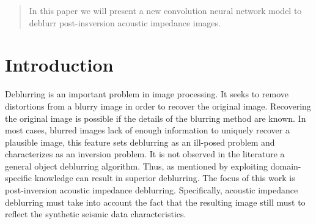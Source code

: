\documentclass[conference,compsoc]{IEEEtran}
\begin{document}




\maketitle

\begin{abstract}
In this paper we will present a new convolution neural network
model to deblurr post-insversion acoustic impedance images.

\end{abstract}





%
\IEEEpeerreviewmaketitle



\section{Introduction}
Deblurring is an important problem in image processing.
It seeks to remove distortions from a blurry image in order to
recover the original image. Recovering the original image
is possible if the details of the blurring method are known.
In most cases, blurred images lack of enough information
to uniquely recover a plausible image, this feature sets
deblurring as an ill-posed problem and characterizes as an inversion problem.
It is not observed in the literature a general object deblurring algorithm. Thus, as mentioned by \cite{Chrysos} exploiting domain-specific
knowledge can result in superior deblurring. The focus of this work is post-inversion acoustic impedance
deblurring. Specifically, acoustic impedance deblurring must take into account the fact that
the resulting image still must to reflect the synthetic seismic data characteristics.
\end{document}
